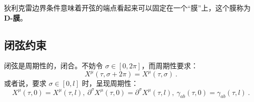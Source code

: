 狄利克雷边界条件意味着开弦的端点看起来可以固定在一个“膜”上，这个膜称为\textbf{ D-膜}。

\subsection{闭弦约束}
闭弦是周期性的，闭合。不妨令 $\sigma \in [0, 2 \pi]$，而周期性要求：
\begin{equation}
	X^\mu(\tau, \sigma + 2\pi) = X^\mu(\tau, \sigma) ~.
\end{equation}
或者说，要求 $\sigma \in [0, l]$ 时，呈现周期性：
\begin{equation}
	X^\mu(\tau, 0) = X^\mu(\tau, l), ~ \partial^\sigma X^\mu(\tau, 0) = \partial^\sigma X^\mu(\tau, l), ~ \gamma_{ab}(\tau, 0) = \gamma_{ab}(\tau, l) ~.
\end{equation}